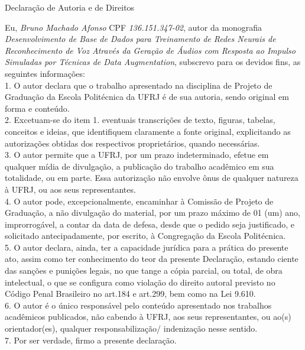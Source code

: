 \begin{center}
Declaração de Autoria e de Direitos
\end{center}

\vspace{0.4cm}

Eu, \emph{Bruno Machado Afonso} CPF \emph{136.151.347-02}, autor da monografia \emph{Desenvolvimento de Base de Dados para Treinamento de Redes Neurais de Reconhecimento de Voz Através da Geração de Áudios com Resposta
ao Impulso Simuladas por Técnicas de Data Augmentation}, subscrevo para os devidos fins, as seguintes informações:\\
1. O autor declara que o trabalho apresentado na disciplina de Projeto de Graduação da Escola Politécnica da UFRJ é de sua autoria, sendo original em forma e conteúdo.\\
2. Excetuam-se do item 1. eventuais transcrições de texto, figuras, tabelas, conceitos e ideias, que identifiquem claramente a fonte original, explicitando as autorizações obtidas dos respectivos proprietários, quando necessárias.\\
3. O autor permite que a UFRJ, por um prazo indeterminado, efetue em qualquer mídia de divulgação, a publicação do trabalho acadêmico em sua totalidade, ou em parte. Essa autorização não envolve ônus de qualquer natureza à UFRJ, ou aos seus representantes.\\
4. O autor pode, excepcionalmente, encaminhar à Comissão de Projeto de Graduação, a não divulgação do material, por um prazo máximo de 01 (um) ano, improrrogável, a contar da data de defesa, desde que o pedido seja justificado, e solicitado antecipadamente, por escrito, à Congregação da Escola Politécnica.\\
5. O autor declara, ainda, ter a capacidade jurídica para a prática do presente ato, assim como ter conhecimento do teor da presente Declaração, estando ciente das sanções e punições legais, no que tange a cópia parcial, ou total, de obra intelectual, o que se configura como violação do direito autoral previsto no Código Penal Brasileiro no art.184 e art.299, bem como na Lei 9.610.\\
6. O autor é o único responsável pelo conteúdo apresentado nos trabalhos acadêmicos publicados, não cabendo à UFRJ, aos seus representantes,  ou ao(s) orientador(es), qualquer responsabilização/ indenização nesse sentido.\\
7. Por ser verdade, firmo a presente declaração.\\

